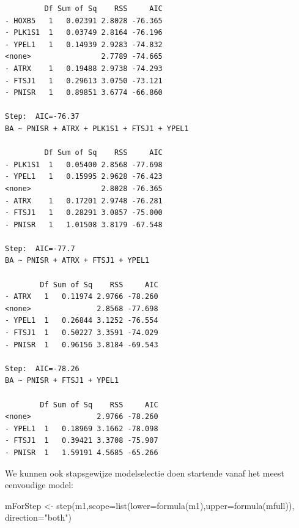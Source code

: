 \documentclass[
  dutch,
  letterpaper,
  12pt]{book}
\newenvironment{Shaded}{\begin{snugshade}}{\end{snugshade}}
\newcommand{\AttributeTok}[1]{\textcolor[rgb]{0.40,0.45,0.13}{#1}}
\newcommand{\FunctionTok}[1]{\textcolor[rgb]{0.28,0.35,0.67}{#1}}
\newcommand{\NormalTok}[1]{\textcolor[rgb]{0.00,0.23,0.31}{#1}}
\newcommand{\OtherTok}[1]{\textcolor[rgb]{0.00,0.23,0.31}{#1}}
\newcommand{\StringTok}[1]{\textcolor[rgb]{0.13,0.47,0.30}{#1}}
\newcounter{none} %
\theoremstyle{definition}
\theoremstyle{definition}
\theoremstyle{definition}
\theoremstyle{remark}
\begin{document}
\begin{verbatim}
         Df Sum of Sq    RSS     AIC
- HOXB5   1   0.02391 2.8028 -76.365
- PLK1S1  1   0.03749 2.8164 -76.196
- YPEL1   1   0.14939 2.9283 -74.832
<none>                2.7789 -74.665
- ATRX    1   0.19488 2.9738 -74.293
- FTSJ1   1   0.29613 3.0750 -73.121
- PNISR   1   0.89851 3.6774 -66.860

Step:  AIC=-76.37
BA ~ PNISR + ATRX + PLK1S1 + FTSJ1 + YPEL1

         Df Sum of Sq    RSS     AIC
- PLK1S1  1   0.05400 2.8568 -77.698
- YPEL1   1   0.15995 2.9628 -76.423
<none>                2.8028 -76.365
- ATRX    1   0.17201 2.9748 -76.281
- FTSJ1   1   0.28291 3.0857 -75.000
- PNISR   1   1.01508 3.8179 -67.548

Step:  AIC=-77.7
BA ~ PNISR + ATRX + FTSJ1 + YPEL1

        Df Sum of Sq    RSS     AIC
- ATRX   1   0.11974 2.9766 -78.260
<none>               2.8568 -77.698
- YPEL1  1   0.26844 3.1252 -76.554
- FTSJ1  1   0.50227 3.3591 -74.029
- PNISR  1   0.96156 3.8184 -69.543

Step:  AIC=-78.26
BA ~ PNISR + FTSJ1 + YPEL1

        Df Sum of Sq    RSS     AIC
<none>               2.9766 -78.260
- YPEL1  1   0.18969 3.1662 -78.098
- FTSJ1  1   0.39421 3.3708 -75.907
- PNISR  1   1.59191 4.5685 -65.266
\end{verbatim}

We kunnen ook stapsgewijze modelselectie doen startende vanaf het meest
eenvoudige model:

\begin{Shaded}
\begin{Highlighting}[]
\NormalTok{mForStep }\OtherTok{\textless{}{-}} \FunctionTok{step}\NormalTok{(m1,}\AttributeTok{scope=}\FunctionTok{list}\NormalTok{(}\AttributeTok{lower=}\FunctionTok{formula}\NormalTok{(m1),}\AttributeTok{upper=}\FunctionTok{formula}\NormalTok{(mfull)), }\AttributeTok{direction=}\StringTok{"both"}\NormalTok{)}
\end{Highlighting}
\end{Shaded}
\end{document}
